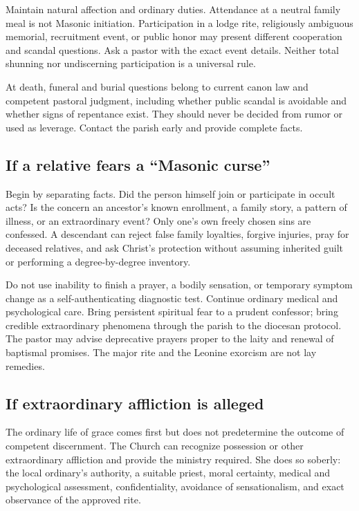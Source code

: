 Maintain natural affection and ordinary duties. Attendance at a neutral family meal is not Masonic initiation. Participation in a lodge rite, religiously ambiguous memorial, recruitment event, or public honor may present different cooperation and scandal questions. Ask a pastor with the exact event details. Neither total shunning nor undiscerning participation is a universal rule.

At death, funeral and burial questions belong to current canon law and competent pastoral judgment, including whether public scandal is avoidable and whether signs of repentance exist. They should never be decided from rumor or used as leverage. Contact the parish early and provide complete facts.

\subsection{If a relative fears a “Masonic curse”}

Begin by separating facts. Did the person himself join or participate in occult acts? Is the concern an ancestor's known enrollment, a family story, a pattern of illness, or an extraordinary event? Only one's own freely chosen sins are confessed. A descendant can reject false family loyalties, forgive injuries, pray for deceased relatives, and ask Christ's protection without assuming inherited guilt or performing a degree-by-degree inventory.

Do not use inability to finish a prayer, a bodily sensation, or temporary symptom change as a self-authenticating diagnostic test. Continue ordinary medical and psychological care. Bring persistent spiritual fear to a prudent confessor; bring credible extraordinary phenomena through the parish to the diocesan protocol. The pastor may advise deprecative prayers proper to the laity and renewal of baptismal promises. The major rite and the Leonine exorcism are not lay remedies.

\subsection{If extraordinary affliction is alleged}

The ordinary life of grace comes first but does not predetermine the outcome of competent discernment. The Church can recognize possession or other extraordinary affliction and provide the ministry required. She does so soberly: the local ordinary's authority, a suitable priest, moral certainty, medical and psychological assessment, confidentiality, avoidance of sensationalism, and exact observance of the approved rite.

